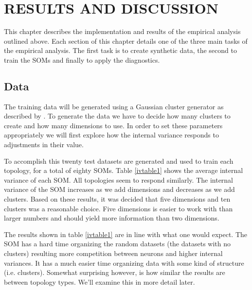 \chapter{RESULTS AND DISCUSSION}
This chapter describes the implementation and results of the empirical analysis
outlined above.  Each section of this chapter details one of the three main
tasks of the empirical analysis.  The first task is to create synthetic data,
the second to train the SOMs and finally to apply the diagnostics.

\section{Data}
The training data will be generated using a Gaussian cluster generator as
described by \cite{handl}.  To generate the data we have to decide how many
clusters to create and how many dimensions to use.  In order to set these
parameters appropriately we will first explore how the internal variance
responds to adjustments in their value.

To accomplish this twenty test datasets are generated and used to train each
topology, for a total of eighty SOMs. Table \ref{ivtable1} shows the average
internal variance of each SOM.  All topologies seem to respond similarly. The
internal variance of the SOM increases as we add dimensions and decreases as
we add clusters. Based on these results, it was decided that five dimensions
and ten clusters was a reasonable choice. Five dimensions is easier to work
with than larger numbers and should yield more information than two
dimensions.

The results shown in table \ref{ivtable1} are in line with what one would expect.
The SOM has a hard time organizing the random datasets (the datasets with no
clusters) resulting more competition between neurons and higher internal
variances. It has a much easier time organizing data with some kind of
structure (i.e. clusters).  Somewhat surprising however, is how similar the
results are between topology types.  We'll examine this in more detail later.

